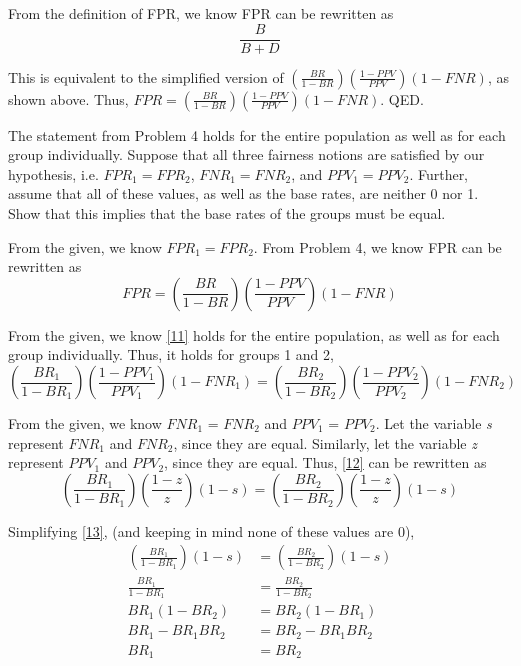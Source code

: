 \documentclass{cisXXX} %
\begin{document}
From the definition of FPR, we know FPR can be rewritten as
$$\frac{B}{B+D}$$

This is equivalent to the simplified version of $(\frac{BR}{1-BR})(\frac{1-PPV}{PPV})(1 -FNR)$, as shown above. Thus, $FPR = (\frac{BR}{1-BR})(\frac{1-PPV}{PPV})(1 -FNR)$. QED.

\HWproblem
The statement from Problem 4 holds for the entire population as well as for each group individually. Suppose that all three fairness notions are satisfied by our hypothesis, i.e. $FPR_1 = FPR_2$, $FNR_1 = FNR_2$, and $PPV_1 = PPV_2$. Further, assume that all of these values, as well as the base rates, are neither 0 nor 1. Show that this implies that the base rates of the groups must be equal.

From the given, we know $FPR_1  = FPR_2$. From Problem 4, we know FPR can be rewritten as
\begin{equation}
\label{11} FPR = (\frac{BR}{1-BR})(\frac{1-PPV}{PPV})(1 -FNR)
\end{equation}

From the given, we know \eqref{11} holds for the entire population, as well as for each group individually. Thus, it holds for groups 1 and 2,
\begin{equation}
\label{12} (\frac{BR_1}{1-BR_1})(\frac{1-PPV_1}{PPV_1})(1 -FNR_1) = (\frac{BR_2}{1-BR_2})(\frac{1-PPV_2}{PPV_2})(1 -FNR_2)
\end{equation}

From the given, we know $FNR_1$ = $FNR_2$ and $PPV_1$ = $PPV_2$. Let the variable \textit{s} represent $FNR_1$ and $FNR_2$, since they are equal. Similarly, let the variable \textit{z} represent $PPV_1$ and $PPV_2$, since they are equal. Thus, \eqref{12} can be rewritten as
\begin{equation}
\label{13} (\frac{BR_1}{1-BR_1})(\frac{1-z}{z})(1 -s) = (\frac{BR_2}{1-BR_2})(\frac{1-z}{z})(1 -s)
\end{equation}

Simplifying \eqref{13}, (and keeping in mind none of these values are 0),
\begin{align*}
(\frac{BR_1}{1-BR_1})(1 -s) &= (\frac{BR_2}{1-BR_2})(1 -s)\\
\frac{BR_1}{1-BR_1} &= \frac{BR_2}{1-BR_2}\\
BR_1(1-BR_2) &= BR_2(1-BR_1)\\
BR_1 - BR_1BR_2 &= BR_2 - BR_1BR_2\\
BR_1 &= BR_2
\end{align*}
\end{document}
